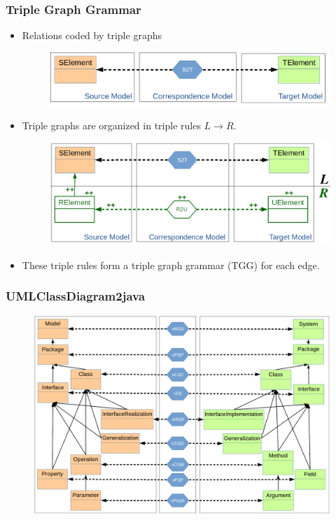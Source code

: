 \documentclass{beamer}
\begin{document}
\begin{frame}
	\frametitle{Triple Graph Grammar}
	\nocite{hermann2011correctness}
	\begin{itemize}
		\item Relations coded by triple graphs
		\begin{figure}
			\includegraphics[width=.7\textwidth]{tripleGraphs}
		\end{figure}
		\pause
		\item Triple graphs are organized in triple rules $L \rightarrow R$.
		\begin{figure}
			\includegraphics[width=.7\textwidth]{tripleRules}
		\end{figure}
		\pause
		\item These triple rules form a triple graph grammar (TGG) for each edge.
	\end{itemize}
\end{frame}

\begin{frame}
	\frametitle{UMLClassDiagram2java}
	\begin{figure}
		\includegraphics[width=.8\textwidth]{umlClassDiagram2java_type}
	\end{figure}
\end{frame}
\end{document}
